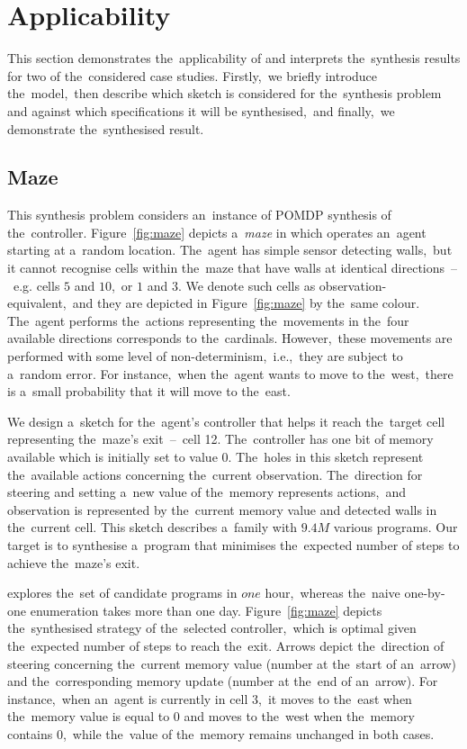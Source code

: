 \section{Applicability}

This section demonstrates the~applicability of \toolname{} and interprets the~synthesis results for two of the~considered case studies.
Firstly,~we briefly introduce the~model,~then describe which sketch is considered for the~synthesis problem and against which specifications it will be synthesised,~and finally,~we demonstrate the~synthesised result.

\subsection{Maze} 
This synthesis problem considers an~instance of POMDP synthesis of the~controller.
Figure~\ref{fig:maze} depicts a~\emph{maze} in which operates an~agent starting at a~random location.
The~agent has simple sensor detecting walls,~but it cannot recognise cells within the~maze that have walls at identical directions \,--\,~e.g. cells $5$ and $10$,~or $1$ and $3$.
We denote such cells as observation-equivalent,~and they are depicted in Figure~\ref{fig:maze} by the~same colour.
The~agent performs the~actions representing the~movements in the~four available directions corresponds to the~cardinals.
However,~these movements are performed with some level of non-determinism,~i.e.,~they are subject to a~random error.
For instance,~when the~agent wants to move to the~west,~there is a~small probability that it will move to the~east.

We design a~sketch for the~agent's controller that helps it reach the~target cell representing the~maze's exit \,--\, cell 12.
The~controller has one bit of memory available which is initially set to value $0$.
The~holes in this sketch represent the~available actions concerning the~current observation.
The~direction for steering and setting a~new value of the~memory represents actions,~and observation is represented by the~current memory value and detected walls in the~current cell.
This sketch describes a~family with $9.4M$ various programs.
Our target is to synthesise a~program that minimises the~expected number of steps to achieve the~maze's exit.

\toolname{} explores the~set of candidate programs in $one$ hour,~whereas the~naive one-by-one enumeration takes more than one day.
Figure~\ref{fig:maze} depicts the~synthesised strategy of the~selected controller,~which is optimal given the~expected number of steps to reach the~exit.
Arrows depict the~direction of steering concerning the~current memory value (number at the~start of an~arrow) and the~corresponding memory update (number at the~end of an~arrow).
For instance,~when an~agent is currently in cell $3$,~it moves to the~east when the~memory value is equal to $0$ and moves to the~west when the~memory contains 0,~while the~value of the~memory remains unchanged in both cases.

